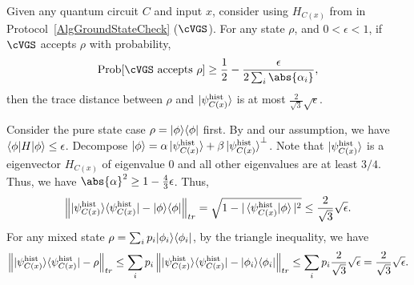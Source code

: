 \begin{theorem} \label{thm:HamCheckClose}
Given any quantum circuit $C$ and input $x$, consider using $H_{C(x)}$ from  in Protocol~\ref{AlgGroundStateCheck} ($\cVGS$). 
For any state $\rho$, and $0< \epsilon < 1$, if $\cVGS$ accepts $\rho$ with probability, 
\[
 \mathrm{Prob}[\cVGS \text{ accepts } \rho] \geq \frac{1}{2} - \frac{\epsilon}{2 \sum_i \abs{\alpha_i}},
\]
then the trace distance between $\rho$ and $\ket{\psi_{C(x)}^{\mathrm{hist}}}$ is at most $\frac{2}{\sqrt{3}}\sqrt{\epsilon}$. 
\end{theorem}

\begin{prf} Consider the pure state case $\rho=|\phi\rangle\langle \phi|$ first. By  and our assumption, we have $\braket{\phi|H|\phi} \leq \epsilon$. 
Decompose $\ket{\phi}= \alpha \ket{\psi_{C(x)}^{\mathrm{hist}}} + \beta \ket{\psi_{C(x)}^{\mathrm{hist}}}^\bot$. Note that $\ket{\psi_{C(x)}^{\mathrm{hist}}}$ is a eigenvector $H_{C(x)}$ of eigenvalue 0 and all other eigenvalues are at least $3/4$. Thus, we have $\abs{\alpha}^2 \geq 1-\frac{4}{3}\epsilon$. Thus, 
\[
   \left\lVert|\psi^{\mathrm{hist}}_{C(x)}\rangle\langle \psi^{\mathrm{hist}}_{C(x)}|- |\phi\rangle\langle \phi|\right\rVert_{tr} = \sqrt{1- |\braket{\psi^{\mathrm{hist}}_{C(x)}|\phi}|^2}
   \leq \frac{2}{\sqrt{3}}\sqrt{\epsilon}.
\]
For any mixed state $\rho=\sum_i p_i |\phi_i\rangle\langle \phi_i|$, by the triangle inequality, we have 
\[
    \left\lVert|\psi^{\mathrm{hist}}_{C(x)}\rangle\langle \psi^{\mathrm{hist}}_{C(x)}|- \rho\right\rVert_{tr} \leq \sum_i p_i    \left\lVert|\psi^{\mathrm{hist}}_{C(x)}\rangle\langle \psi^{\mathrm{hist}}_{C(x)}|- |\phi_i\rangle\langle \phi_i|\right\rVert_{tr} \leq \sum_i p_i \frac{2}{\sqrt{3}} \sqrt{\epsilon} =\frac{2}{\sqrt{3}}\sqrt{\epsilon}.
\]
\end{prf}

